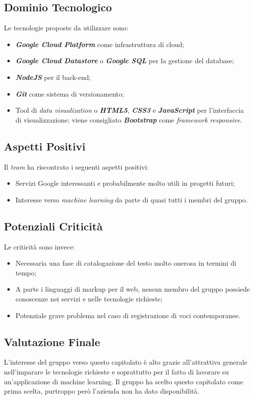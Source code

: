 \subsection{Dominio Tecnologico}
Le tecnologie proposte da utilizzare sono:
\begin{itemize}
	\item \textit{\textbf{Google Cloud Platform}} come infrastruttura di cloud;
	\item \textbf{\textit{Google Cloud Datastore}} o \textbf{\textit{Google SQL}} per la gestione del database;
	\item \textbf{\textit{NodeJS}} per il back-end;
	\item \textbf{\textit{Git}} come sistema di versionamento;
	\item Tool di \textit{data visualization} o \textbf{\textit{HTML5}}, \textbf{\textit{CSS3}} e \textbf{\textit{JavaScript}} per l'interfaccia di visualizzazione; viene consigliato \textbf{\textit{Bootstrap}} come \textit{framework} \textit{responsive}.
\end{itemize}

\subsection{Aspetti Positivi}
Il \textit{team} ha riscontrato i seguenti aspetti positivi:
\begin{itemize}
	\item Servizi Google interessanti e probabilmente molto utili in progetti futuri;
	\item Interesse verso \textit{machine learning} da parte di quasi tutti i membri del gruppo.
\end{itemize}

\subsection{Potenziali Criticità}
Le criticità sono invece:
\begin{itemize}
	\item Necessaria una fase di catalogazione del testo molto onerosa in termini di tempo;
	\item A parte i linguaggi di markup per il web, nessun membro del gruppo possiede conoscenze nei servizi e nelle tecnologie richieste;
	\item Potenziale grave problema nel caso di registrazione di voci contemporanee.
\end{itemize}

\subsection{Valutazione Finale}
L'interesse del gruppo verso questo capitolato è alto grazie all'attrattiva generale nell'imparare le tecnologie richieste e soprattutto per il fatto di lavorare su un'applicazione di machine learning.
Il gruppo ha scelto questo capitolato come prima scelta, purtroppo però l'azienda non ha dato disponibilità.